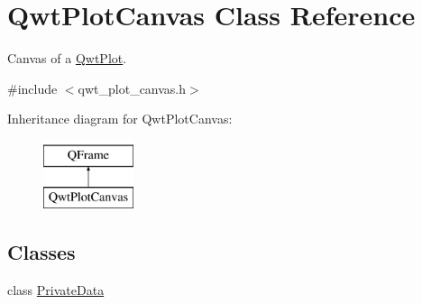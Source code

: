\hypertarget{class_qwt_plot_canvas}{\section{Qwt\-Plot\-Canvas Class Reference}
\label{class_qwt_plot_canvas}
}


Canvas of a \hyperlink{class_qwt_plot}{Qwt\-Plot}.  




{\ttfamily \#include $<$qwt\-\_\-plot\-\_\-canvas.\-h$>$}

Inheritance diagram for Qwt\-Plot\-Canvas\-:\begin{figure}[H]
\begin{center}
\leavevmode
\includegraphics[height=2.000000cm]{class_qwt_plot_canvas}
\end{center}
\end{figure}
\subsection*{Classes}
\begin{DoxyCompactItemize}
\item 
class \hyperlink{class_qwt_plot_canvas_1_1_private_data}{Private\-Data}
\end{DoxyCompactItemize}
